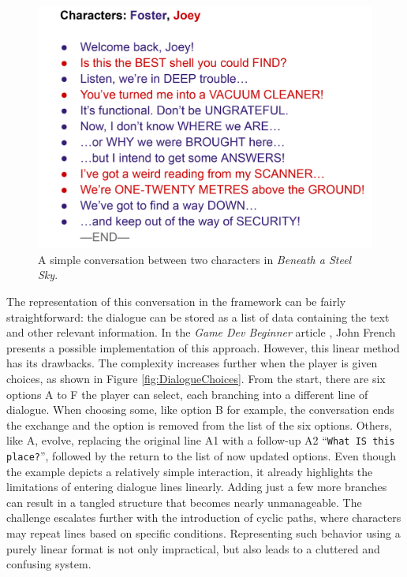 \begin{figure}[H]
\centering
\includegraphics[width=.6\linewidth]{img/dialogueSimple.png}
\caption{A simple conversation between two characters in \textit{Beneath a Steel Sky}.}
\label{fig:DialogueSimple}
\end{figure}

The representation of this conversation in the framework can be fairly straightforward: the dialogue can be stored as a list of data containing the text and other relevant information. In the \textit{Game Dev Beginner} article \cite{Dialogue-French}, John French presents a possible implementation of this approach. However, this linear method has its drawbacks. The complexity increases further when the player is given choices, as shown in Figure \ref{fig:DialogueChoices}. From the start, there are six options A to F the player can select, each branching into a different line of dialogue. When choosing some, like option B for example, the conversation ends the exchange and the option is removed from the list of the six options.  Others, like A, evolve, replacing the original line A1 with a follow-up A2 “\texttt{What IS this place?}”, followed by the return to the list of now updated options. Even though the example depicts a relatively simple interaction, it already highlights the limitations of entering dialogue lines linearly. Adding just a few more branches can result in a tangled structure that becomes nearly unmanageable. The challenge escalates further with the introduction of cyclic paths, where characters may repeat lines based on specific conditions. Representing such behavior using a purely linear format is not only impractical, but also leads to a cluttered and confusing system.

